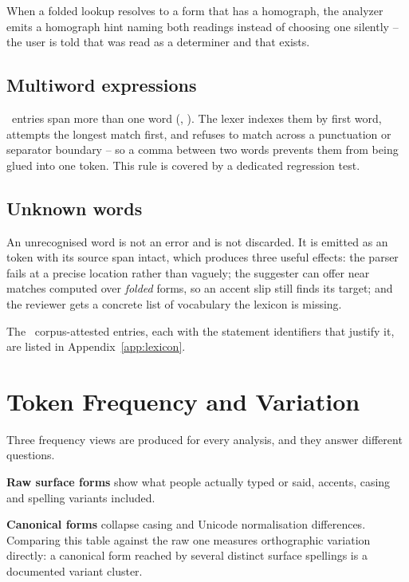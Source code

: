 When a folded lookup resolves to a form that has a homograph, the analyzer emits a
homograph hint naming both readings instead of choosing one silently -- the user is told
that  was read as a determiner and that  exists.

\subsection{Multiword expressions}

\LexiconMultiword\ entries span more than one word (, ). The lexer indexes them by first word, attempts the longest match first, and
refuses to match across a punctuation or separator boundary -- so a comma between two words
prevents them from being glued into one token. This rule is covered by a dedicated
regression test.

\subsection{Unknown words}

An unrecognised word is not an error and is not discarded. It is emitted as an
 token with its source span intact, which produces three useful effects: the
parser fails at a precise location rather than vaguely; the suggester can offer near
matches computed over \emph{folded} forms, so an accent slip still finds its target; and
the reviewer gets a concrete list of vocabulary the lexicon is missing.

The \LexiconCorpus\ corpus-attested entries, each with the statement identifiers that
justify it, are listed in Appendix~\ref{app:lexicon}.

\section{Token Frequency and Variation}\label{sec:frequency}

Three frequency views are produced for every analysis, and they answer different questions.

\textbf{Raw surface forms} show what people actually typed or said, accents, casing and
spelling variants included.



\textbf{Canonical forms} collapse casing and Unicode normalisation differences. Comparing
this table against the raw one measures orthographic variation directly: a canonical form
reached by several distinct surface spellings is a documented variant cluster.

